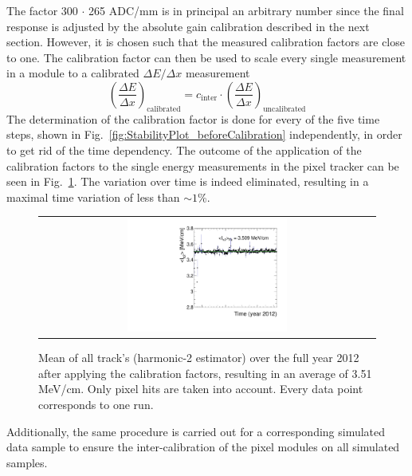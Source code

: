 The factor 300 $\cdot$ 265 ADC/mm is in principal an arbitrary number since the final response is adjusted by the absolute gain calibration described in the next section.
However, it is chosen such that the measured calibration factors are close to one.
The calibration factor can then be used to scale every single measurement in a module to a calibrated $\Delta E/\Delta x$ measurement
\begin{equation}
\left( \frac{\Delta E}{\Delta x}\right)_{\text{calibrated}}=c_{\text{inter}} \cdot \left(\frac{\Delta E}{\Delta x}\right)_{\text{uncalibrated}}
\end{equation}
The determination of the calibration factor is done for every of the five time steps, shown in Fig.~\ref{fig:StabilityPlot_beforeCalibration} independently, in order to get rid of the time dependency. 
The outcome of the application of the calibration factors to the single energy measurements in the pixel tracker can be seen in Fig.~\ref{fig:StabilityPlot_afterCalibration}.
The variation over time is indeed eliminated, resulting in a maximal time variation of less than $\sim1$\%.

\begin{figure}[!t]
  \centering 
  \begin{tabular}{c}
  \includegraphics[width=0.49\textwidth]{figures/analysis/PixelCalibration/StabilityPlot_Pixel_afterCalibration_withoutStepFits_NEW.pdf}
  \end{tabular}
  \caption{Mean of all track's \dedx (harmonic-2 estimator) over the full year 2012 after applying the calibration factors, resulting in an average \dedx of 3.51 MeV/cm. Only pixel hits are taken into account. Every data point corresponds to one run.} 
  \label{fig:StabilityPlot_afterCalibration}
\end{figure}


Additionally, the same procedure is carried out for a corresponding simulated data sample to ensure the inter-calibration of the pixel modules on all simulated samples.



